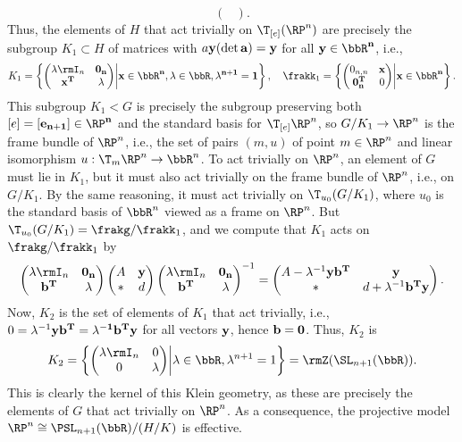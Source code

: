\begin{example}
\[\begin{pmatrix}
    \end{pmatrix}.
    \]
    Thus, the elements of $H$ that act trivially on $\T_{[e]}(\RP^n)$ are precisely the subgroup $K_1\subset H$ of matrices with $a\bf{y} (\det a)=\bf{y}$ for all $\bf{y}\in\bbR^n$, i.e., 
    \[K_1=\left\{ 
        \begin{pmatrix}
            \lambda \rmI_n & \bf{0}_n \\
            \bf{x}^T & \lambda
        \end{pmatrix} \middle| \bf{x}\in\bbR^n,\lambda\in\bbR, \lambda^{n+1}=1
    \right\}, \quad \frakk_1=\left\{ 
        \begin{pmatrix}
            \mathrm{0}_{n,n} & \bf{x} \\
            \bf{0}_n^T & 0
        \end{pmatrix} \middle| \bf{x}\in\bbR^n\right\}.\]
    This subgroup $K_1<G$ is precisely the subgroup preserving both $[e]=[\bf{e}_{n+1}]\in\RP^n$ and the standard basis for $\T_{[e]}\RP^n$, so $G\slash K_1\to \RP^n$ is the frame bundle of $\RP^n$, i.e., the set of pairs $(m,u)$ of point $m\in \RP^n$ and linear isomorphism $u:\T_m\RP^n\to \bbR^n$.  To act trivially on $\RP^n$, an element of $G$ must lie in $K_1$, but it must also act trivially on the frame bundle of $\RP^n$, i.e., on $G\slash K_1$. By the same reasoning, it must act trivially on $\T_{u_0}(G\slash K_1)$, where $u_0$ is the standard basis of $\bbR^n$ viewed as a frame on $\RP^n$. But $\T_{u_0}(G\slash K_1)=\frakg\slash\frakk_1$, and we compute that $K_1$ acts on $\frakg\slash\frakk_1$ by 
    \[\begin{pmatrix}
        \lambda\rmI_n & \bf{0}_n\\
        \bf{b}^T & \lambda
    \end{pmatrix}
    \begin{pmatrix}
        A & \bf{y} \\
        \ast& d
    \end{pmatrix}
    \begin{pmatrix}
        \lambda\rmI_n & \bf{0}_n\\
        \bf{b}^T & \lambda
    \end{pmatrix}^{-1}=
    \begin{pmatrix}
        A-\lambda^{-1}\bf{y}\bf{b}^T& \bf{y}\\
        \ast  & d+\lambda^{-1}\bf{b}^T\bf{y}
    \end{pmatrix}.
    \]
    Now, $K_2$ is the set of elements of $K_1$ that act trivially, i.e., $0=\lambda^{-1}\bf{y}\bf{b}^T=\lambda^{-1}\bf{b}^T\bf{y}$ for all vectors $\bf{y}$, hence $\bf{b}=0$. Thus, $K_2$ is 
    \[K_2=\left\{ 
        \begin{pmatrix}
            \lambda \rmI_n & 0 \\
            0 & \lambda
        \end{pmatrix} \middle| \lambda\in\bbR, \lambda^{n+1}=1
    \right\}=\rmZ(\SL_{n+1}(\bbR)).\]
    This is clearly the kernel of this Klein geometry, as these are precisely the elements of $G$ that act trivially on $\RP^n$. As a consequence, the projective model $\RP^n\cong \PSL_{n+1}(\bbR)\slash (H\slash K)$ is effective.
\end{example}


